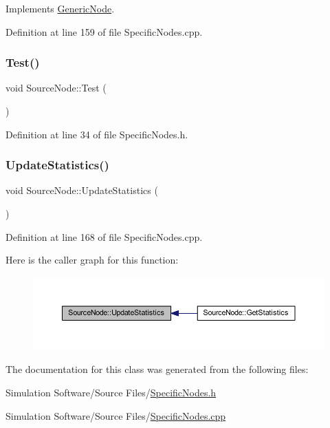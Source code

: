 Implements \hyperlink{class_generic_node_ae942258a57f211072d179da470579add}{Generic\+Node}.



Definition at line 159 of file Specific\+Nodes.\+cpp.

\mbox{\label{class_source_node_acb96be478aebf6c2badd1c5d1164e24c}} 
\subsubsection{\texorpdfstring{Test()}{Test()}}
{\footnotesize\ttfamily void Source\+Node\+::\+Test (\begin{DoxyParamCaption}{ }\end{DoxyParamCaption})\hspace{0.3cm}{\ttfamily [inline]}}



Definition at line 34 of file Specific\+Nodes.\+h.

\mbox{\label{class_source_node_a6c5037fd886362d56b7ce04094433510}} 
\subsubsection{\texorpdfstring{Update\+Statistics()}{UpdateStatistics()}}
{\footnotesize\ttfamily void Source\+Node\+::\+Update\+Statistics (\begin{DoxyParamCaption}{ }\end{DoxyParamCaption})}



Definition at line 168 of file Specific\+Nodes.\+cpp.

Here is the caller graph for this function\+:
\nopagebreak
\begin{figure}[H]
\begin{center}
\leavevmode
\includegraphics[width=350pt]{class_source_node_a6c5037fd886362d56b7ce04094433510_icgraph}
\end{center}
\end{figure}


The documentation for this class was generated from the following files\+:\begin{DoxyCompactItemize}
\item 
Simulation Software/\+Source Files/\hyperlink{_specific_nodes_8h}{Specific\+Nodes.\+h}\item 
Simulation Software/\+Source Files/\hyperlink{_specific_nodes_8cpp}{Specific\+Nodes.\+cpp}\end{DoxyCompactItemize}
